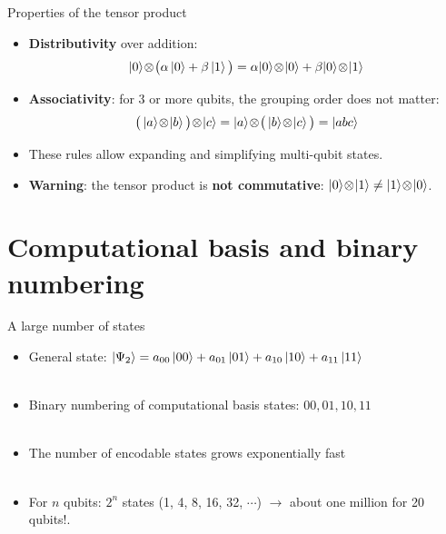 \documentclass[aspectratio=169,12pt]{beamer}
\begin{document}
\begin{frame}{Properties of the tensor product}
  \begin{itemize}[<+->]
    \setlength{\itemsep}{0.6em}
    \item \textbf{Distributivity} over addition:
    $$\ket{0}\!\otimes\!\big(\alpha\ket{0}+\beta\ket{1}\big)
      = \alpha\!\ket{0}\!\otimes\!\ket{0}+\beta\!\ket{0}\!\otimes\!\ket{1}$$
    \item \textbf{Associativity}: for 3 or more qubits, the grouping order does not matter:
    $$\big(\ket{a}\!\otimes\!\ket{b}\big)\!\otimes\!\ket{c}
      = \ket{a}\!\otimes\!\big(\ket{b}\!\otimes\!\ket{c}\big)
      = \ket{abc}$$
    \item These rules allow expanding and simplifying multi-qubit states.
    \item \textbf{Warning}: the tensor product is \textbf{not commutative}:
     $\ket{0}\!\otimes\!\ket{1} \neq \ket{1}\!\otimes\!\ket{0}$.
  \end{itemize}
\end{frame}

\section{Computational basis and binary numbering}

\begin{frame}{A large number of states}
  \begin{itemize}
    \item General state: $\ket{\Psi_2} = a_{00}\ket{00}+a_{01}\ket{01}+a_{10}\ket{10}+a_{11}\ket{11}$
    \\~\\
    \item Binary numbering of computational basis states: $00, 01, 10, 11$
    \\~\\
    \item The number of encodable states grows exponentially fast
    \\~\\
    \item For $n$ qubits: $2^n$ states (1, 4, 8, 16, 32, $\cdots$) $\rightarrow$ about one million for 20 qubits!.
  \end{itemize}
\end{frame}

\end{document}
